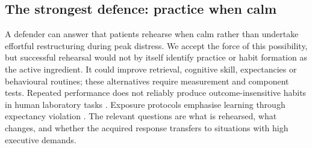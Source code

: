 \subsection{The strongest defence: practice when calm}
A defender can answer that patients rehearse when calm rather than undertake effortful restructuring during peak distress.
We accept the force of this possibility, but successful rehearsal would not by itself identify practice or habit formation as the active ingredient.
It could improve retrieval, cognitive skill, expectancies or behavioural routines; these alternatives require measurement and component tests.
Repeated performance does not reliably produce outcome-insensitive habits in human laboratory tasks \citep{dewit2018failures}.
Exposure protocols emphasise learning through expectancy violation \citep{craske2014maximizing}.
The relevant questions are what is rehearsed, what changes, and whether the acquired response transfers to situations with high executive demands.
